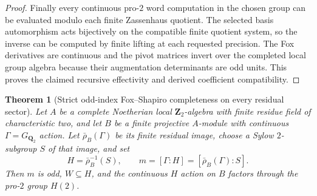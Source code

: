 \documentclass[11pt]{article}
\newtheorem{theorem}{Theorem}[section]
\theoremstyle{definition}
\begin{document}
\begin{proof}
Finally every
continuous pro-$2$
word computation
in the chosen
group can be
evaluated modulo
each finite
Zassenhaus
quotient.
The selected
basis automorphism
acts bijectively
on the compatible
finite quotient
system, so the
inverse can be
computed by
finite lifting
at each requested
precision.
The Fox
derivatives are
continuous and
the pivot matrices
invert over the
completed local
group algebra
because their
augmentation
determinants
are odd units.
This proves the
claimed
recursive effectivity
and derived
coefficient
compatibility.
\end{proof}

\begin{theorem}[Strict odd-index Fox--Shapiro completeness on every residual sector]
\label{thm:dyadic-f135-full-marked-all-residual-completeness}
Let $A$ be a complete
Noetherian local
$\mathbf Z_2$-algebra
with finite residue
field of characteristic
two, and let
$B$ be a finite
projective $A$-module
with continuous
$\Gamma=G_{\mathbf Q_2}$
action.
Let $\bar\rho_B(\Gamma)$
be its finite
residual image,
choose a Sylow
$2$-subgroup
$S$ of that
image, and set
\begin{equation}\label{eq:dyadic-f135-residual-sylow-preimage}
H=\bar\rho_B^{-1}(S),
\qquad
m=[\Gamma:H]
=[\bar\rho_B(\Gamma):S].
\end{equation}
Then $m$ is odd,
$W\subseteq H$,
and the
continuous $H$
action on $B$
factors through
the pro-$2$
group $H(2)$.


\end{theorem}
\end{document}
